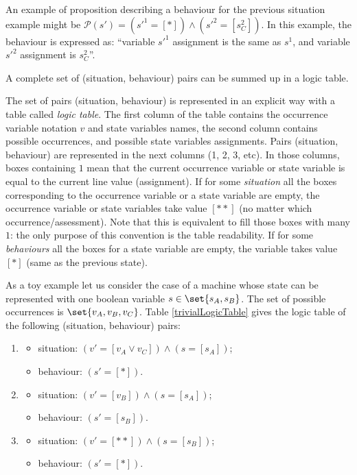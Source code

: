 An example of proposition describing a behaviour 
for the previous situation example might be 
$\mathcal{P}(s') = (s'^{1} = [*]) \land (s'^{2} = [s^2_{C}])$. 
In this example, the behaviour is expressed as: ``variable $s'^{1}$ assignment 
is the same as $s^{1}$, and variable $s'^{2}$ assignment is $s^2_{C}$''.

A complete set of (situation, behaviour) pairs can be summed up in a logic table.
\begin{Def}
The set of pairs (situation, behaviour) is represented 
in an explicit way with a table called \emph{logic table}. 
The first column of the table contains the occurrence variable notation $v$ 
and state variables names, 
the second column contains possible occurrences, 
and possible state variables assignments. 
Pairs (situation, behaviour) are represented in the next columns (1, 2, 3, etc).
In those columns, boxes containing $1$ mean that the current occurrence variable
or state variable is equal to the current line value (assignment). 
If for some \emph{situation} all the boxes corresponding to the 
occurrence variable or a state variable are empty, 
the occurrence variable or state variables take 
value $[**]$ (no matter which occurrence/assessment). 
Note that this is equivalent to fill 
those boxes with many $1$: the only purpose of this 
convention is the table readability.
If for some \emph{behaviours} all the boxes 
for a state variable are empty, the variable takes 
value $[*]$ (same as the previous state). 
\end{Def}
As a toy example let us consider the case of a machine whose state can be represented with one boolean variable $s \in \set{s_A,s_B}$. 
The set of possible occurrences is $\set{v_A,v_B,v_C}$. 
Table \ref{trivialLogicTable} gives the logic table of the following
(situation, behaviour) pairs: 
\begin{enumerate}
\item
\begin{itemize}
\item situation: $(v' = [v_{A} \lor v_{C}]) \land (s = [s_{A}])$; 
\item behaviour: $(s' = [*])$.
\end{itemize}
\item
\begin{itemize}
\item situation: $(v' = [v_{B}]) \land (s = [s_{A}])$;
\item behaviour: $(s' = [s_B])$.
\end{itemize}
\item
\begin{itemize}
\item situation: $(v' = [**]) \land (s = [s_{B}])$;
\item behaviour: $(s' = [*])$.
\end{itemize}
\end{enumerate}
